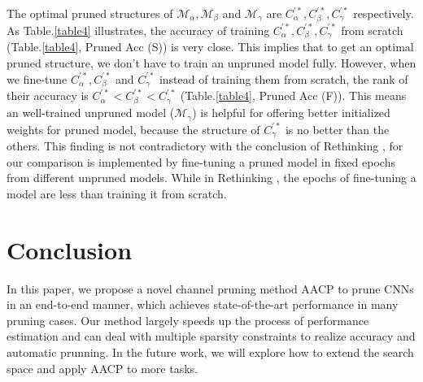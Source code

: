 \documentclass[final]{cvpr}
\begin{document}
The optimal pruned structures of $\mathcal{M}_\alpha, \mathcal{M}_\beta$ and $\mathcal{M}_\gamma$ are
$C^{'*}_\alpha, C^{'*}_\beta, C^{'*}_\gamma$ respectively. As Table.\ref{table4} illustrates, 
the accuracy of training $C^{'*}_\alpha, C^{'*}_\beta, C^{'*}_\gamma$ from scratch (Table.\ref{table4}, Pruned Acc (S)) is very close.
This implies that to get an optimal pruned structure, we don't have to train an unpruned model fully. However, when we fine-tune
$C^{'*}_\alpha, C^{'*}_\beta$ and $C^{'*}_\gamma$ instead of training them from scratch, the rank of their accuracy is 
$C^{'*}_\alpha < C^{'*}_\beta < C^{'*}_\gamma$ (Table.\ref{table4}, Pruned Acc (F)). This means an well-trained unpruned model ($\mathcal{M}_\gamma$)
is helpful for offering better initialized
weights for pruned model, because the structure of $C^{'*}_\gamma$ is no better than the others.
This finding is not contradictory with the conclusion of Rethinking \cite{liu2018rethinking}, for our comparison is implemented by fine-tuning a pruned model 
in fixed epochs from different unpruned models. While in Rethinking \cite{liu2018rethinking}, the epochs of fine-tuning a model are less than training it from scratch.

\section{Conclusion}

In this paper, we propose a novel channel pruning method AACP to prune CNNs in an end-to-end manner, which achieves state-of-the-art 
performance in many pruning cases. Our method largely speeds up the process of performance estimation and can deal with multiple 
sparsity constraints to realize accuracy and automatic prunning. In the future work, we will explore how to extend the search space and apply AACP to more tasks. 


{\small


}
\end{document}
